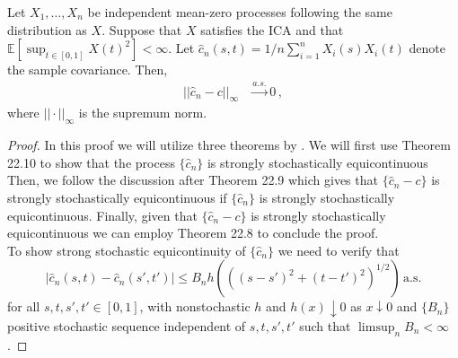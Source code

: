 \begin{theorem}\label{thm:uniform-convergence-kernel}
    Let $X_1, \dots, X_n$ be independent mean-zero processes following the same distribution as $X$.
    Suppose that $X$ satisfies the ICA and that $\mathbb{E}[\sup_{t \in [0, 1]} X(t)^2] < \infty$. Let
    $\hat{c}_n(s, t) = 1/n \sum_{i = 1}^n X_i(s) X_i(t)$ denote the sample covariance. Then,
    \begin{align}
        || \hat{c}_n - c ||_\infty &\overset{a.s.}{\to} 0 \,,
    \end{align}
    where $|| \cdot ||_\infty$ is the supremum norm.
\end{theorem}
\begin{proof}
    In this proof we will utilize three theorems by \cite{davidson2021}. We will first use Theorem
    22.10 to show that the process $\{\hat{c}_n\}$ is strongly stochastically equicontinuous
    Then, we follow the discussion after Theorem 22.9 which gives that
    $\{\hat{c}_n - c\}$ is strongly stochastically equicontinuous if $\{\hat{c}_n\}$ is strongly
    stochastically equicontinuous. Finally, given that $\{\hat{c}_n - c\}$ is strongly
    stochastically equicontinuous we can employ Theorem 22.8 to conclude the proof.\\

    \noindent To show strong stochastic equicontinuity of $\{\hat{c}_n\}$ we need to verify that
    \[
        |\hat{c}_n(s, t) - \hat{c}_n(s', t')| \leq B_n h\left(((s - s')^2 + (t -
        t')^2)^{1/2}\right) \, \text{a.s.}
    \]
    for all $s, t, s', t' \in [0, 1]$, with nonstochastic $h$ and $h(x) \downarrow 0$ as $x
    \downarrow 0$ and $\{B_n\}$ positive stochastic sequence independent of $s, t, s', t'$ such that
    $\limsup_n B_n < \infty$.


\end{proof}
